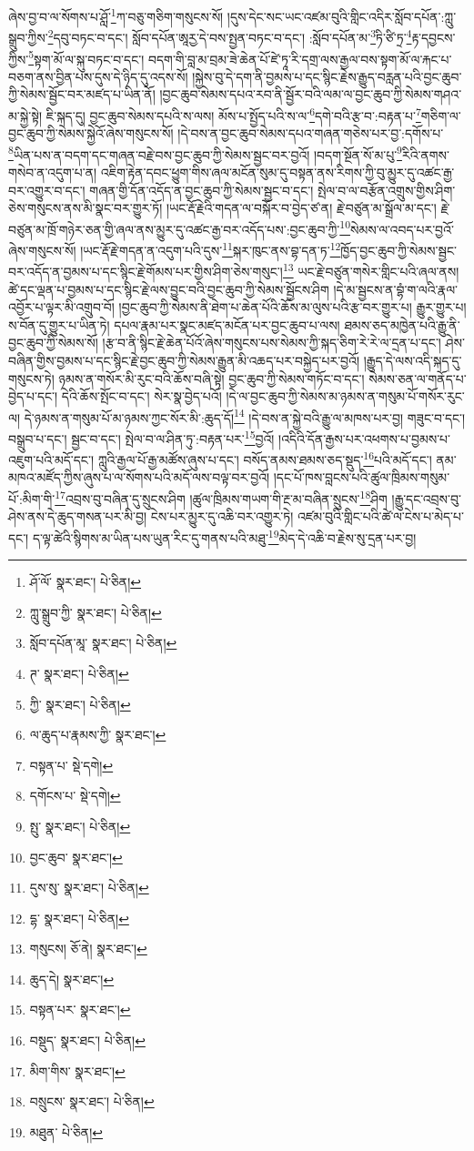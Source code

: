 ཞེས་བྱ་བ་ལ་སོགས་པ་ཤློ་\footnote{ཤོ་ལོ་  སྣར་ཐང་།  པེ་ཅིན། }ཀ་བཅུ་གཅིག་གསུངས་སོ། །དུས་དེང་སང་ཡང་འཛམ་བུའི་གླིང་འདིར་སློབ་དཔོན་:ཀླུ་སྒྲུབ་ཀྱིས་\footnote{ཀླུ་སྒྲུབ་ཀྱི་  སྣར་ཐང་།  པེ་ཅིན། }དབུ་བཏང་བ་དང་། སློབ་དཔོན་ཨཱརྱ་དེ་བས་སྤྱན་བཏང་བ་དང་། :སློབ་དཔོན་མ་\footnote{སློབ་དཔོན་མཱ་  སྣར་ཐང་།  པེ་ཅིན། }ཏི་ཙི་ཏྲ་\footnote{ཊ་  སྣར་ཐང་།  པེ་ཅིན། }རྟ་དབྱངས་ཀྱིས་\footnote{ཀྱི་  སྣར་ཐང་།  པེ་ཅིན། }སྟག་མོ་ལ་སྐུ་བཏང་བ་དང་། བདག་གི་བླ་མ་བྲམ་ཟེ་ཆེན་པོ་ཛེ་ཏཱ་རི་དགྲ་ལས་རྒྱལ་བས་སྟག་མོ་ལ་རྐང་པ་བཅག་ནས་བྱིན་པས་དུས་དེ་ཉིད་དུ་འདས་སོ། །སྐྱེས་བུ་དེ་དག་ནི་བྱམས་པ་དང་སྙིང་རྗེས་རྒྱུད་བརླན་པའི་བྱང་ཆུབ་ཀྱི་སེམས་སྦྱོང་བར་མཛད་པ་ཡིན་ནོ། །བྱང་ཆུབ་སེམས་དཔའ་རབ་ནི་སྦྱོར་བའི་ལམ་ལ་བྱང་ཆུབ་ཀྱི་སེམས་གཤའ་མ་སྐྱེ་སྟེ། ཇི་སྐད་དུ། བྱང་ཆུབ་སེམས་དཔའི་ས་ལས། མོས་པ་སྤྱོད་པའི་ས་ལ་\footnote{ལ་ཆུད་པ་རྣམས་ཀྱི་  སྣར་ཐང་། }དགེ་བའི་རྩ་བ་:བརྟན་པ་\footnote{བསྟན་པ་  སྡེ་དགེ། }གཅིག་ལ་བྱང་ཆུབ་ཀྱི་སེམས་སྐྱེའོ་ཞེས་གསུངས་སོ། །དེ་བས་ན་བྱང་ཆུབ་སེམས་དཔའ་གཞན་གཅེས་པར་བྱ་:དགོས་པ་\footnote{དགོངས་པ་  སྡེ་དགེ། }ཡིན་པས་ན་བདག་དང་གཞན་བརྗེ་བས་བྱང་ཆུབ་ཀྱི་སེམས་སྦྱང་བར་བྱའོ། །བདག་སྔོན་སོ་མ་པུ་\footnote{སྤུ་  སྣར་ཐང་།  པེ་ཅིན། }རིའི་ནགས་གསེབ་ན་འདུག་པ་ན། འཇིག་རྟེན་དབང་ཕྱུག་གིས་ཞལ་མངོན་སུམ་དུ་བསྟན་ནས་རིགས་ཀྱི་བུ་མྱུར་དུ་འཚང་རྒྱ་བར་འགྱུར་བ་དང་། གཞན་གྱི་དོན་འདོད་ན་བྱང་ཆུབ་ཀྱི་སེམས་སྦྱང་བ་དང་། སྤེལ་བ་ལ་བརྩོན་འགྲུས་གྱིས་ཤིག་ཅེས་གསུངས་ནས་མི་སྣང་བར་གྱུར་ཏོ། །ཡང་རྡོ་རྗེའི་གདན་ལ་བསྐོར་བ་བྱེད་ཙ་ན། རྗེ་བཙུན་མ་སྒྲོལ་མ་དང་། རྗེ་བཙུན་མ་ཁྲོ་གཉེར་ཅན་གྱི་ཞལ་ནས་མྱུར་དུ་འཚང་རྒྱ་བར་འདོད་པས་:བྱང་ཆུབ་ཀྱི་\footnote{བྱང་ཆུབ་  སྣར་ཐང་། }སེམས་ལ་འབད་པར་བྱའོ་ཞེས་གསུངས་སོ། །ཡང་རྡོ་རྗེ་གདན་ན་འདུག་པའི་དུས་\footnote{དུས་སུ་  སྣར་ཐང་།  པེ་ཅིན། }སྐར་ཁུང་ནས་བྷ་དན་ཏ་\footnote{དྷ་  སྣར་ཐང་།  པེ་ཅིན། }ཁྱོད་བྱང་ཆུབ་ཀྱི་སེམས་སྦྱང་བར་འདོད་ན་བྱམས་པ་དང་སྙིང་རྗེ་གོམས་པར་གྱིས་ཤིག་ཅེས་གསུང་།\footnote{གསུངས།  ཅོ་ནེ།  སྣར་ཐང་། } ཡང་རྗེ་བཙུན་གསེར་གླིང་པའི་ཞལ་ནས། ཚེ་དང་ལྡན་པ་བྱམས་པ་དང་སྙིང་རྗེ་ལས་བྱུང་བའི་བྱང་ཆུབ་ཀྱི་སེམས་སྦྱོངས་ཤིག །དེ་མ་སྦྱངས་ན་བྷཾ་ག་ལའི་རྣལ་འབྱོར་པ་ལྟར་མི་འགྲུབ་བོ། །བྱང་ཆུབ་ཀྱི་སེམས་ནི་ཐེག་པ་ཆེན་པོའི་ཆོས་མ་ལུས་པའི་རྩ་བར་གྱུར་པ། རྒྱུར་གྱུར་པ། ས་བོན་དུ་གྱུར་པ་ཡིན་ཏེ། དཔལ་རྣམ་པར་སྣང་མཛད་མངོན་པར་བྱང་ཆུབ་པ་ལས། ཐམས་ཅད་མཁྱེན་པའི་རྒྱུ་ནི་བྱང་ཆུབ་ཀྱི་སེམས་སོ། །རྩ་བ་ནི་སྙིང་རྗེ་ཆེན་པོའོ་ཞེས་གསུངས་པས་སེམས་ཀྱི་སྐད་ཅིག་རེ་རེ་ལ་དྲན་པ་དང་། ཤེས་བཞིན་གྱིས་བྱམས་པ་དང་སྙིང་རྗེ་བྱང་ཆུབ་ཀྱི་སེམས་རྒྱུན་མི་འཆད་པར་བསྐྱེད་པར་བྱའོ། །རྒྱུད་དེ་ལས་འདི་སྐད་དུ་གསུངས་ཏེ། ཉམས་ན་གསོར་མི་རུང་བའི་ཆོས་བཞི་སྟེ། བྱང་ཆུབ་ཀྱི་སེམས་གཏོང་བ་དང་། སེམས་ཅན་ལ་གནོད་པ་བྱེད་པ་དང་། དེའི་ཆོས་སྤོང་བ་དང་། སེར་སྣ་བྱེད་པའོ། །དེ་ལ་བྱང་ཆུབ་ཀྱི་སེམས་མ་ཉམས་ན་གསུམ་པོ་གསོར་རུང་ལ། དེ་ཉམས་ན་གསུམ་པོ་མ་ཉམས་ཀྱང་སོར་མི་:ཆུད་དོ།\footnote{ཆུད་དེ།  སྣར་ཐང་། } །དེ་བས་ན་སྐྱེ་བའི་རྒྱུ་ལ་མཁས་པར་བྱ། གཟུང་བ་དང་། བསྒྲུབ་པ་དང་། སྦྱང་བ་དང་། སྤེལ་བ་ལ་ཤིན་ཏུ་:བརྟན་པར་\footnote{བསྟན་པར་  སྣར་ཐང་། }བྱའོ། །འདིའི་དོན་རྒྱས་པར་འཕགས་པ་བྱམས་པ་འཇུག་པའི་མདོ་དང་། ཀླུའི་རྒྱལ་པོ་རྒྱ་མཚོས་ཞུས་པ་དང་། བསོད་ནམས་ཐམས་ཅད་སྡུད་\footnote{བསྡུད་  སྣར་ཐང་།  པེ་ཅིན། }པའི་མདོ་དང་། ནམ་མཁའ་མཛོད་ཀྱིས་ཞུས་པ་ལ་སོགས་པའི་མདོ་ལས་བལྟ་བར་བྱའོ། །དང་པོ་ཁས་བླངས་པའི་ཚུལ་ཁྲིམས་གསུམ་པོ་:མིག་གི་\footnote{མིག་གིས་  སྣར་ཐང་། }འབྲས་བུ་བཞིན་དུ་སྲུངས་ཤིག །ཚུལ་ཁྲིམས་གཡག་གི་རྔ་མ་བཞིན་སྲུངས་\footnote{བསྲུངས་  སྣར་ཐང་།  པེ་ཅིན། }ཤིག །རྒྱུ་དང་འབྲས་བུ་ཤེས་ནས་དེ་ཆུད་གསན་པར་མི་བྱ། ངེས་པར་མྱུར་དུ་འཆི་བར་འགྱུར་ཏེ། འཛམ་བུའི་གླིང་པའི་ཚེ་ལ་ངེས་པ་མེད་པ་དང་། ད་ལྟ་ཚེའི་སྙིགས་མ་ཡིན་པས་ཡུན་རིང་དུ་གནས་པའི་མཐུ་\footnote{མཐུན་  པེ་ཅིན། }མེད་དེ་འཆི་བ་རྗེས་སུ་དྲན་པར་བྱ། 